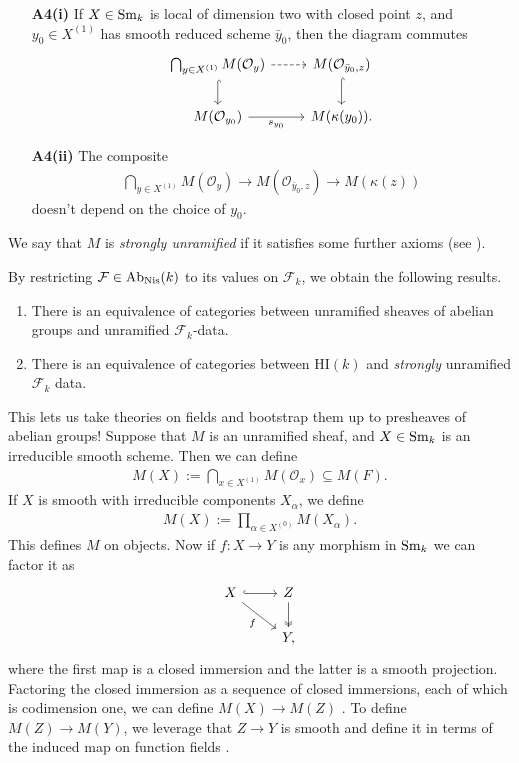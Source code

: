 \documentclass[11pt,openany]{book}
\providecommand{\HI}{\mathrm{HI}}
\begin{document}
\begin{definition}
\begin{enumerate}
    \item[\textbf{A4(i)}] If $X\in \mathrm{Sm}_k$ is local of dimension two with closed point $z$, and $y_0 \in X^{(1)}$ has smooth reduced scheme $\bar{y}_0$, then the diagram commutes
\[ \begin{tikzcd}
    \bigcap_{y\in X^{(1)}} M(\mathcal{O}_y)\dar[hook]\rar[dashed] & M(\mathcal{O}_{\bar{y}_0,z})\dar[hook]\\
    M(\mathcal{O}_{y_0})\rar["s_{y_0}" below] & M(\kappa(y_0)).
\end{tikzcd} \]

    \item[\textbf{A4(ii)}] The composite
    \begin{align*}
        \bigcap_{y\in X^{(1)}}M(\mathcal{O}_y) \to M(\mathcal{O}_{\bar{y}_0,z}) \to M(\kappa(z))
    \end{align*}
    doesn't depend on the choice of $y_0$.
\end{enumerate}
We say that $M$ is \textit{strongly unramified} if it satisfies some further axioms (see \cite[\S2]{Morel}).
\end{definition}

\begin{theorem}\label{thm:restriction-to-Fk}
\cite[2.27]{Morel} By restricting $\mathcal{F}\in \mathrm{Ab}_{\mathrm{Nis}}(k)$ to its values on $\mathcal{F}_k$, we obtain the following results.
\begin{enumerate}
    \item There is an equivalence of categories between unramified sheaves of abelian groups and unramified $\mathcal{F}_k$-data.
    \item There is an equivalence of categories between $\HI(k)$ and \textit{strongly} unramified $\mathcal{F}_k$ data.
\end{enumerate}
\end{theorem}

This lets us take theories on fields and bootstrap them up to presheaves of abelian groups! Suppose that $M$ is an unramified sheaf, and $X\in \mathrm{Sm}_k$ is an irreducible smooth scheme. Then we can define
\begin{align*}
    M(X) := \bigcap_{x\in X^{(1)}} M(\mathcal{O}_x) \subseteq M(F).
\end{align*}
If $X$ is smooth with irreducible components $X_\alpha$, we define
\begin{align*}
    M(X) := \prod_{\alpha\in X^{(0)}}M(X_\alpha).
\end{align*}
This defines $M$ on objects. Now if $f \colon X \to Y$ is any morphism in $\mathrm{Sm}_k$ we can factor it as
\[ \begin{tikzcd}
    X\rar[hook]\ar[dr,"f" below left] & Z\dar[two heads]\\
     & Y,
\end{tikzcd} \]
where the first map is a closed immersion and the latter is a smooth projection. Factoring the closed immersion as a sequence of closed immersions, each of which is codimension one, we can define $M(X) \to M(Z)$ \cite[2.13]{Morel}. To define $M(Z) \to M(Y)$, we leverage that $Z \to Y$ is smooth and define it in terms of the induced map on function fields \cite[p.~17]{Morel}.
\end{document}
